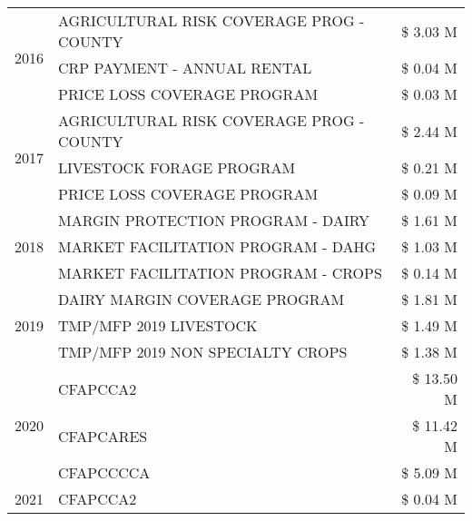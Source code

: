 \begin{tabular}{llr}
\cline{1-3}
\multirow[t]{3}{*}{2016} & AGRICULTURAL RISK COVERAGE PROG - COUNTY & \$ 3.03 M \\
 & CRP PAYMENT - ANNUAL RENTAL & \$ 0.04 M \\
 & PRICE LOSS COVERAGE PROGRAM & \$ 0.03 M \\
\cline{1-3}
\multirow[t]{3}{*}{2017} & AGRICULTURAL RISK COVERAGE PROG - COUNTY & \$ 2.44 M \\
 & LIVESTOCK FORAGE PROGRAM & \$ 0.21 M \\
 & PRICE LOSS COVERAGE PROGRAM & \$ 0.09 M \\
\cline{1-3}
\multirow[t]{3}{*}{2018} & MARGIN PROTECTION PROGRAM - DAIRY & \$ 1.61 M \\
 & MARKET FACILITATION PROGRAM - DAHG & \$ 1.03 M \\
 & MARKET FACILITATION PROGRAM - CROPS & \$ 0.14 M \\
\cline{1-3}
\multirow[t]{3}{*}{2019} & DAIRY MARGIN COVERAGE PROGRAM & \$ 1.81 M \\
 & TMP/MFP 2019 LIVESTOCK & \$ 1.49 M \\
 & TMP/MFP 2019 NON SPECIALTY CROPS & \$ 1.38 M \\
\cline{1-3}
\multirow[t]{3}{*}{2020} & CFAPCCA2 & \$ 13.50 M \\
 & CFAPCARES & \$ 11.42 M \\
 & CFAPCCCCA & \$ 5.09 M \\
\cline{1-3}
2021 & CFAPCCA2 & \$ 0.04 M \\
\cline{1-3}
\bottomrule
\end{tabular}
